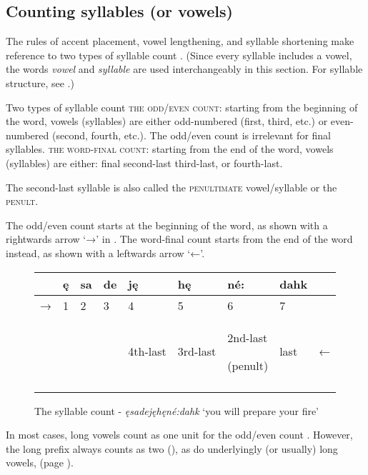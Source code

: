 \subsection{Counting syllables (or vowels)}
\label{counting.syllables}
The rules of accent placement, vowel lengthening, and syllable shortening make reference to two types of syllable count . (Since every syllable includes a vowel, the words \textit{vowel} and \textit{syllable} are used interchangeably in this section. For syllable structure, see .)

\ea\label{ex:syllcountex1} Two types of syllable count
\ea \textsc{the odd/even count}: starting from the beginning of the word, vowels (syllables) are either odd-numbered (first, third, etc.) or even-numbered (second, fourth, etc.).\label{ex:syllcountex1a}
\ea The odd/even count is irrelevant for final syllables.
\z
\ex \textsc{the word-final count}: starting from the end of the word, vowels (syllables) are either:\label{ex:syllcountex1b}
\ea final\label{ex:syllcountex1c}
\ex second-last\label{ex:syllcountex1d}
\ex third-last, or\label{ex:syllcountex1e}
\ex fourth-last.\label{ex:syllcountex1f}
\z
\z
\z

The second-last syllable is also called the \textsc{penultimate} vowel/syllable or the \textsc{penult}.

The odd/even count starts at the beginning of the word, as shown with a rightwards arrow ‘→’ in . The word-final count starts from the end of the word instead, as shown with a leftwards arrow ‘←’.

\begin{figure}
\caption{The syllable count - \textit{ęsadejęhęné:dahk} ‘you will prepare your fire’ }
\label{figtab:1:syllcount}
\begin{tabularx}{\textwidth}{XXXXXXXXX} 
\lsptoprule
& ę & sa & de & ję & hę & né: & dahk & \\
\midrule

 → & 1 & 2 & 3 & 4 & 5 & 6 & 7 & \\
 \midrule
&  &  &  & 4th-last & 3rd-last & 2nd-last

(penult) & last & ←\\
\lspbottomrule
\end{tabularx}
\end{figure}

In most cases, long vowels count as one unit for the odd/even count . However, the long  {\indefinite} prefix always counts as two (), as do underlyingly (or usually) long vowels,  (page \pageref{figtab:1:longvsyll}).

